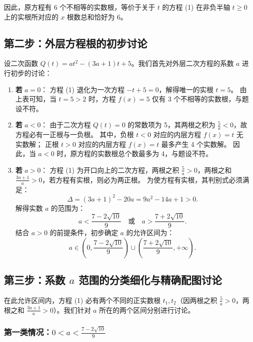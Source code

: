 \documentclass[11pt,a4paper]{ctexart}
\begin{document}
因此，原方程有 6 个不相等的实数根，等价于关于 \(t\) 的方程 (1) 在非负半轴 \(t \ge 0\) 上的实根所对应的 \(x\) 根数总和恰好为 6。

\subsection{第二步：外层方程根的初步讨论}

设二次函数 \(Q(t) = at^2 - (3a+1)t + 5\)。我们首先对外层二次方程的系数 \(a\) 进行初步的讨论：
\begin{enumerate}[label=(\arabic*)]
  \item \textbf{若 } \(a = 0\)：
    方程 (1) 退化为一次方程 \(-t + 5 = 0\)，解得唯一的实根 \(t = 5\)。
    由上表可知，当 \(t = 5 > 2\) 时，方程 \(f(x) = 5\) 仅有 3 个不相等的实数根，与题设不符。
  \item \textbf{若 } \(a < 0\)：
    由于二次方程 \(Q(t) = 0\) 的常数项为 5，其两根之积为 \(\frac{5}{a} < 0\)，故方程必有一正根与一负根。
    其中，负根 \(t < 0\) 对应的内层方程 \(f(x) = t\) 无实数解；
    正根 \(t > 0\) 对应的内层方程 \(f(x) = t\) 最多产生 4 个实数解。
    因此，当 \(a < 0\) 时，原方程的实数根总个数最多为 4，与题设不符。
  \item \textbf{若 } \(a > 0\)：
    方程 (1) 为开口向上的二次方程，两根之积 \(\frac{5}{a} > 0\)，两根之和 \(\frac{3a+1}{a} > 0\)，若方程有实根，则必为两正根。
    为使方程有实根，其判别式必须满足：
    \[
    \Delta = (3a+1)^2 - 20a = 9a^2 - 14a + 1 > 0.
    \]
    解得实数 \(a\) 的范围为：
    \[
    a < \frac{7-2\sqrt{10}}{9} \quad \text{或} \quad a > \frac{7+2\sqrt{10}}{9}.
    \]
    结合 \(a > 0\) 的前提条件，初步确定 \(a\) 的允许区间为：
    \[
    a \in \left( 0, \frac{7-2\sqrt{10}}{9} \right) \cup \left( \frac{7+2\sqrt{10}}{9}, +\infty \right).
    \]
\end{enumerate}

\subsection{第三步：系数 \(a\) 范围的分类细化与精确配图讨论}

在此允许区间内，方程 (1) 必有两个不同的正实数根 \(t_1, t_2\)（因两根之积 \(\frac{5}{a} > 0\)，两根之和 \(\frac{3a+1}{a} > 0\)）。我们针对 \(a\) 所在的两个区间分别进行讨论。

\subsubsection{第一类情况：\(0 < a < \frac{7-2\sqrt{10}}{9}\)}
\end{document}

